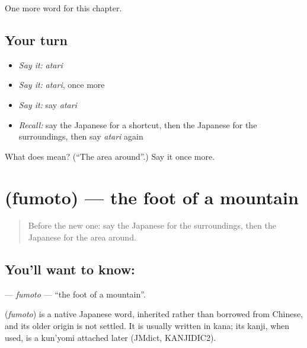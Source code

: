 \begin{grammarlens}[title={What you've built}]
One more word for this chapter.
\end{grammarlens}

\subsection*{Your turn}
\begin{itemize}
\raggedright
  \item \emph{Say it:} \emph{atari}
  \item \emph{Say it:} \emph{atari}, once more
  \item \emph{Say it:} say \emph{atari}
  \item \emph{Recall:} say the Japanese for a shortcut, then the Japanese for the surroundings, then say \emph{atari} again
\end{itemize}

\begin{tcolorbox}[breakable,colback=teal!4,colframe=teal!35!black,title={Before you move on}]
What does  mean? (\textquotedblleft{}The area around\textquotedblright{}.) Say it once more.
\end{tcolorbox}
\section[\texorpdfstring{\ja{ふもと} (fumoto)}{ふもと (fumoto)}]{ (fumoto) — the foot of a mountain}

\label{lesson:JA-C81-fumoto}



\begin{quote}
Before the new one: say the Japanese for the surroundings, then the Japanese for the area around.
\end{quote}

\subsection*{You'll want to know: }
\textbf{} — \emph{fumoto} — \textquotedblleft{}the foot of a mountain\textquotedblright{}.

\begin{cousinweb}
\textbf{} (\emph{fumoto}) is a native Japanese word, inherited rather than borrowed from Chinese, and its older origin is not settled. It is usually written in kana; its kanji, when used, is a kun'yomi attached later (JMdict, KANJIDIC2).
\end{cousinweb}

